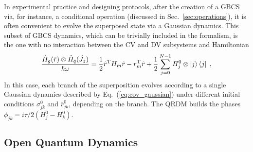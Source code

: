 \documentclass[%
reprint,
superscriptaddress,
nofootinbib,
 amsmath,amssymb,
prx,
floatfix,
]{revtex4-2}
\begin{document}
In experimental practice and designing protocols, after the creation of a GBCS via, for instance, a conditional operation (discussed in Sec.~\ref{sec:operations}), it is often convenient to evolve the superposed state via a Gaussian dynamics. This subset of GBCS dynamics, which can be trivially included in the formalism, is the one with no interaction between the CV and DV subsystems and Hamiltonian
\begin{equation}
\label{eq:Hamiltonian_no_int}
    \frac{\hat{H}_g (\hat{r}) \otimes \hat{H}_q(\hat{J}_z)}{\hbar \omega} = \frac{1}{2} \hat{r}^{\rm T} H_{m} \hat{r} - r_{m} ^{\rm T} \hat{r}  + \frac{1}{2} \sum_{j = 0}^{N - 1}   H_j^0  \otimes \ket{j} \bra{j} \nonumber    \;,
\end{equation}
In this case, each branch of the superposition evolves according to a single Gaussian dynamics described by Eq.~(\ref{eq:cov_gaussian}) under different initial conditions $\sigma_{jk}^{0}$ and $\bar{r}_{jk}^{0}$, depending on the branch. The QRDM builds the phases $\phi_{jk} = i \tau/2 (H_j^{0} - H_k^{0})$.



\subsection{Open Quantum Dynamics \label{sec:open}}
\end{document}
